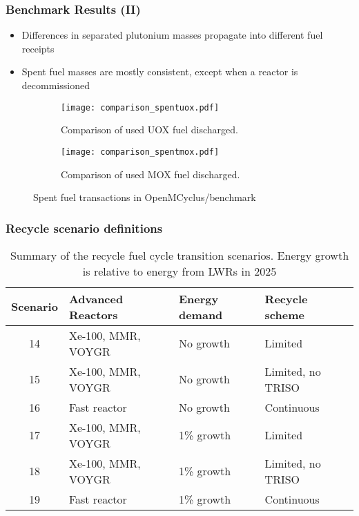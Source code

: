 \begin{frame}
    \frametitle{Benchmark Results (II)}
        \begin{itemize}
            \item Differences in separated plutonium masses 
                  propagate into different fuel receipts 
            \item Spent fuel masses are mostly consistent, except 
                  when a reactor is decommissioned
        \end{itemize}
        \begin{figure}
            \centering
            \begin{subfigure}{0.48\textwidth}
                \texttt{[image: comparison\_spentuox.pdf]}
                \caption{Comparison of used UOX fuel discharged.}
            \end{subfigure}
            \hfill
            \begin{subfigure}{0.48\textwidth}
                \texttt{[image: comparison\_spentmox.pdf]}
                \caption{Comparison of used MOX fuel discharged.}
            \end{subfigure}
            \caption{Spent fuel transactions in OpenMCyclus/\Cycamore benchmark}
            \label{fig:spentfuel_benchmark}
        \end{figure}

\end{frame}

\begin{frame}
    \frametitle{Recycle scenario definitions}
    \begin{table}[ht]
        \centering
        \caption{Summary of the recycle fuel cycle transition scenarios.
        Energy growth is relative to energy from \glspl{LWR} in 2025}
        \label{tab:scenarios_recycle}
        \begin{tabular}{c l l l}
            \hline
            Scenario & Advanced Reactors & Energy demand & Recycle scheme\\\hline
            \rowcolor{lightgray}14 & Xe-100, MMR, VOYGR & No growth & Limited \\
            \rowcolor{lightgray}15 & Xe-100, MMR, VOYGR & No growth & Limited, no TRISO\\
            \rowcolor{lightgray}16 & Fast reactor & No growth & Continuous \\
            \rowcolor{lightpink}17 & Xe-100, MMR, VOYGR & 1\% growth & Limited \\
            \rowcolor{lightpink}18 & Xe-100, MMR, VOYGR & 1\% growth & Limited, no TRISO\\
            \rowcolor{lightpink}19 & Fast reactor & 1\% growth & Continuous\\
            \hline
    \end{tabular}
    \end{table}
\end{frame}

